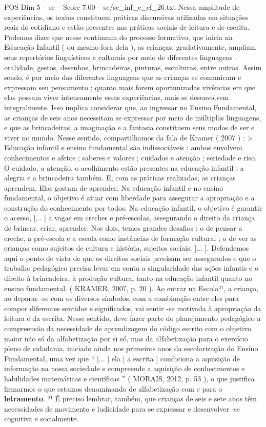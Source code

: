 \begin{textsample}{POS Dim 5 – sc – Score 7.00 – sc/sc\_inf\_e\_ef\_26.txt}
Nessa amplitude de experiências, os textos constituem práticas discursivas utilizadas em situações reais do cotidiano e estão presentes nas práticas sociais de leitura e de escrita.
Podemos dizer que nesse continuum do processo formativo, que inicia na Educação Infantil ( ou mesmo fora dela ), as crianças, gradativamente, ampliam seus repertórios linguísticos e culturais por meio de diferentes linguagens : oralidade, gestos, desenhos, brincadeiras, pinturas, esculturas, entre outras.
Assim sendo, é por meio das diferentes linguagens que as crianças se comunicam e expressam seu pensamento ; quanto mais forem oportunizadas vivências em que elas possam viver intensamente essas experiências, mais se desenvolvem integralmente.
Isso implica considerar que, ao ingressar no Ensino Fundamental, as crianças de seis anos necessitam se expressar por meio de múltiplas linguagens, e que as brincadeiras, a imaginação e a fantasia constituem seus modos de ser e viver no mundo.
Nesse sentido, compartilhamos da fala de Kramer ( 2007 ) : > Educação infantil e ensino fundamental são indissociáveis : ambos envolvem conhecimentos e afetos ; saberes e valores ; cuidados e atenção ; seriedade e riso.
O cuidado, a atenção, o acolhimento estão presentes na educação infantil ; a alegria e a brincadeira também.
E, com as práticas realizadas, as crianças aprendem.
Elas gostam de aprender.
Na educação infantil e no ensino fundamental, o objetivo é atuar com liberdade para assegurar a apropriação e a construção do conhecimento por todos.
Na educação infantil, o objetivo é garantir o acesso, [... ] a vagas em creches e pré-escolas, assegurando o direito da criança de brincar, criar, aprender.
Nos dois, temos grandes desafios : o de pensar a creche, a pré-escola e a escola como instâncias de formação cultural ; o de ver as crianças como sujeitos de cultura e história, sujeitos sociais. [... ].
Defendemos aqui o ponto de vista de que os direitos sociais precisam ser assegurados e que o trabalho pedagógico precisa levar em conta a singularidade das ações infantis e o direito à brincadeira, à produção cultural tanto na educação infantil quanto no ensino fundamental. ( KRAMER, 2007, p. 20 ).
Ao entrar na Escola²¹, a criança, ao deparar -se com os diversos símbolos, com a combinação entre eles para compor diferentes sentidos e significados, vai sentir -se motivada à apropriação da leitura e da escrita.
Nesse sentido, deve fazer parte do planejamento pedagógico a compreensão da necessidade de aprendizagem do código escrito com o objetivo maior não só da alfabetização por si só, mas da alfabetização para o exercício pleno de cidadania, iniciado ainda nos primeiros anos da escolarização do Ensino Fundamental, uma vez que “ [... ] ela [ a escrita ] condiciona a aquisição de informação na nossa sociedade e compreende a aquisição de conhecimentos e habilidades matemáticas e científicas ” ( MORAIS, 2012, p. 53 ), o que justifica firmarmos o que estamos denominando de alfabetização com e para o \textbf{letramento}. ²¹ É preciso lembrar, também, que crianças de seis e sete anos têm necessidades de movimento e ludicidade para se expressar e desenvolver -se cognitiva e socialmente.

\end{textsample}
